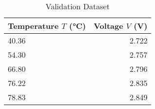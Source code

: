\begin{table}[h]
  \centering
  \caption{Validation Dataset}
  \label{tab:pt100}
  \begin{tabular}{lr}
    \toprule
    \textbf{Temperature $T$ (°C)} & \textbf{Voltage $V$ (V)} \\
    \midrule
    40.36 & 2.722 \\
    54.30 & 2.757 \\
    66.80 & 2.796 \\
    76.22 & 2.835 \\
    78.83 & 2.849 \\
    \bottomrule
  \end{tabular}
\end{table}
